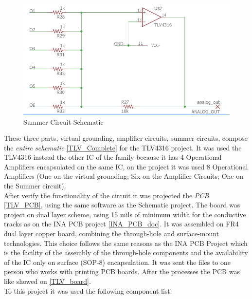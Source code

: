 \begin{figure}[!htpb]
\centering
\caption{Summer Circuit Schematic}
\label{Sum_Sch}
\includegraphics[scale=0.4]{images/tlv_sum}
\end{figure}

These three parts, virtual grounding, amplifier circuits, summer circuits, compose the \textit{entire schematic} \autoref{TLV_Complete} for the TLV4316 project. It was used the TLV4316 instead the other IC of the family
because it has 4 Operational Amplifiers encapsulated on the same IC, on the project it was used 8 Operational Amplifiers (One on the virtual grounding; Six on the Amplifier Circuits; One on
the Summer circuit).\\

After verify the functionality of the circuit it was projected the \textit{PCB} \autoref{TLV_PCB}, using the same software as the Schematic project. The board was project on dual layer
scheme, using 15 mils of minimum width for the conductive tracks as on the INA PCB project \autoref{INA_PCB_doc}. It was assembled on FR4 dual layer copper
board, combining the through-hole and surface-mount technologies. This choice follows the same reasons as the INA PCB Project which is
the facility of the assembly of the through-hole components and the availability
of the IC only on surface (SOP-8) encapsulation. It was sent
the files to one person who works with printing PCB boards. After the processes
the PCB was like showed on \autoref{TLV_board}.\\

To this project it was used the following component list:

